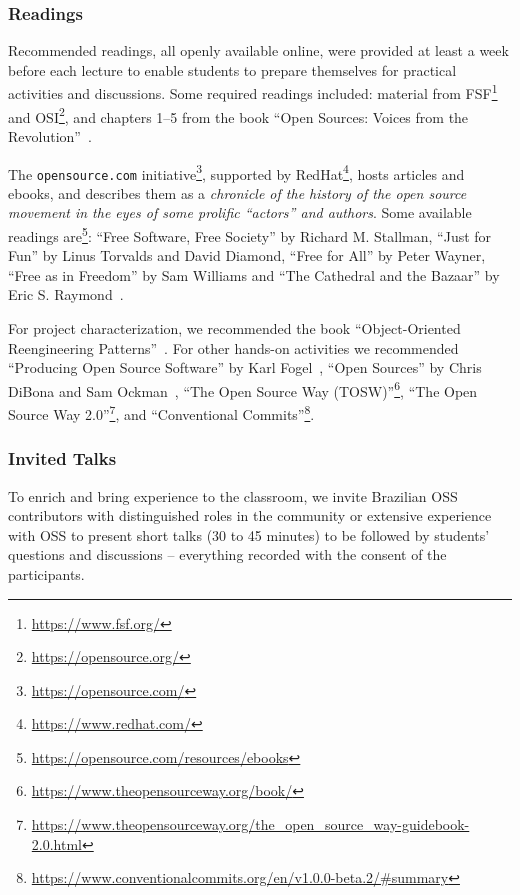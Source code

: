 \documentclass[sigconf]{acmart}
\begin{document}
\subsubsection{Readings} \label{leituras}

Recommended readings, all openly available online, 
were provided at least a week before each lecture to enable students to prepare themselves for practical activities and discussions. Some required readings included: 
material from FSF\footnote{\url{https://www.fsf.org/}} and OSI\footnote{\url{https://opensource.org/}}, and chapters 1--5 from the book
``Open Sources: Voices from the Revolution''~\cite{dibona1999sources}.


The \texttt{opensource.com} initiative\footnote{\url{https://opensource.com/}}, supported by RedHat\footnote{\url{https://www.redhat.com/}}, hosts articles and ebooks, and describes them as a \textit{chronicle of the history of the open source movement in the eyes of some prolific ``actors'' and authors}. Some available readings are\footnote{\url{https://opensource.com/resources/ebooks}}: 
``Free Software, Free Society'' by Richard M. Stallman, 
``Just for Fun'' by Linus Torvalds and David Diamond,
``Free for All'' by Peter Wayner, 
``Free as in Freedom'' by Sam Williams and
``The Cathedral and the Bazaar'' by Eric S. Raymond~\cite{ESR:Cathedral}.

For project characterization, we recommended the book ``Object-Oriented Reengineering Patterns''~\cite{demeyer2008}.
For other hands-on activities we recommended ``Producing Open Source Software'' by Karl Fogel~\cite{ProducingOSS}, 
``Open Sources'' by Chris DiBona and Sam Ockman~\cite{dibona1999sources}, ``The Open Source Way (TOSW)''\footnote{\url{https://www.theopensourceway.org/book/}},
``The Open Source Way 2.0''\footnote{\url{https://www.theopensourceway.org/the_open_source_way-guidebook-2.0.html}},
and ``Conventional Commits''\footnote{\url{https://www.conventionalcommits.org/en/v1.0.0-beta.2/\#summary}}.

\subsubsection{Invited Talks}

To enrich and bring experience to the classroom, we invite Brazilian OSS contributors with distinguished roles in the community or extensive experience with OSS to present short talks (30 to 45 minutes) to be followed by students' questions and discussions -- everything recorded with the consent of the participants.
\end{document}
